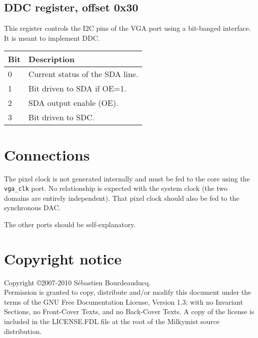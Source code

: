 \documentclass[a4paper,11pt]{article}
\begin{document}
\subsection{DDC register, offset 0x30}
This register controls the I2C pins of the VGA port using a bit-banged interface. It is meant to implement DDC.

\begin{tabular}{|l|l|}
\hline
\textbf{Bit} & \textbf{Description} \\
\hline
0 & Current status of the SDA line. \\
\hline
1 & Bit driven to SDA if OE=1. \\
\hline
2 & SDA output enable (OE). \\
\hline
3 & Bit driven to SDC. \\
\hline
\end{tabular}

\section{Connections}
The pixel clock is not generated internally and must be fed to the core using the \verb!vga_clk! port. No relationship is expected with the system clock (the two domains are entirely independent). That pixel clock should also be fed to the synchronous DAC.

The other ports should be self-explanatory.

\section*{Copyright notice}
Copyright \copyright 2007-2010 S\'ebastien Bourdeauducq. \\
Permission is granted to copy, distribute and/or modify this document under the terms of the GNU Free Documentation License, Version 1.3; with no Invariant Sections, no Front-Cover Texts, and no Back-Cover Texts. A copy of the license is included in the LICENSE.FDL file at the root of the Milkymist source distribution.
\end{document}
